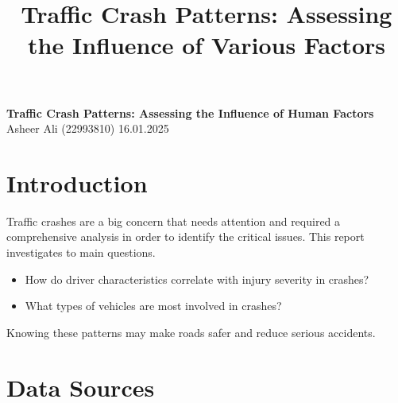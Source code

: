 \documentclass[a4paper,12pt]{article}
\title{Traffic Crash Patterns: Assessing the Influence of Various Factors}
\author{} %
\date{} %
\begin{document}
\begin{center}
    \textbf{\Large Traffic Crash Patterns: Assessing the Influence of Human Factors} \\[1em]
    Asheer Ali (22993810) \hspace{2cm} 16.01.2025
\end{center}

	\section{Introduction}
    Traffic crashes are a big concern that needs attention and required a comprehensive analysis in order to identify the critical issues. This report investigates to main questions. 
		\begin{itemize}
			\item How do driver characteristics correlate with injury severity in crashes?
			\item What types of vehicles are most involved in crashes?	\end{itemize}
	
    Knowing these patterns may make roads safer and reduce serious accidents.

\section{Data Sources}
\end{document}
